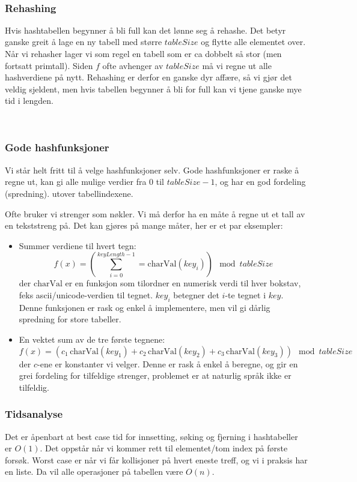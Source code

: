 ~\\
\subsubsection{Rehashing}
Hvis hashtabellen begynner å bli full kan det lønne seg å rehashe. Det betyr ganske greit å lage en ny tabell med større $ tableSize $ og flytte alle elementet over. Når vi rehasher lager vi som regel en tabell som er ca dobbelt så stor (men fortsatt primtall). Siden $ f $ ofte avhenger av $ tableSize $ må vi regne ut alle hashverdiene på nytt. Rehashing er derfor en ganske dyr affære, så vi gjør det veldig sjeldent, men hvis tabellen begynner å bli for full kan vi tjene ganske mye tid i lengden. 

~\\
\subsubsection{Gode hashfunksjoner}
Vi står helt fritt til å velge hashfunksjoner selv. Gode hashfunksjoner er raske å regne ut, kan gi alle mulige verdier fra $ 0 $ til $ tableSize - 1 $, og har en god fordeling (spredning). utover tabellindexene. 

Ofte bruker vi strenger som nøkler. Vi må derfor ha en måte å regne ut et tall av en tekststreng på. Det kan gjøres på mange måter, her er et par eksempler:
\begin{itemize}
\item Summer verdiene til hvert tegn:
\[ f(x) = \left( \sum_{i=0}^{keyLength-1} = \text{charVal}(key_i) \right) \mod{tableSize} \]
der $ \text{charVal} $ er en funksjon som tilordner en numerisk verdi til hver bokstav, feks ascii/unicode-verdien til tegnet. $ key_i $ betegner det $ i $-te tegnet i $ key $. Denne funksjonen er rask og enkel å implementere, men vil gi dårlig spredning for store tabeller. 
\item En vektet sum av de tre første tegnene:
\[ f(x) = \left( c_1\,\text{charVal}(key_1) + c_2\,\text{charVal}(key_2) + c_3\,\text{charVal}(key_3)\right)  \mod{tableSize} \]
der $ c $-ene er konstanter vi velger. Denne er rask å enkel å beregne, og gir en grei fordeling for tilfeldige strenger, problemet er at naturlig språk ikke er tilfeldig.
\end{itemize}


\subsubsection{Tidsanalyse}
Det er åpenbart at best case tid for innsetting, søking og fjerning i hashtabeller er $ O(1) $. Det oppstår når vi kommer rett til elementet/tom index på første forsøk. Worst case er når vi får kollisjoner på hvert eneste treff, og vi i praksis har en liste. Da vil alle operasjoner på tabellen være $ O(n) $. 

